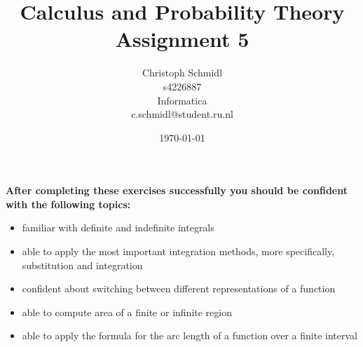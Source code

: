 \documentclass[a4paper]{article}
\title{Calculus and Probability Theory\\ Assignment 5}
\author{Christoph Schmidl\\
s4226887\\
Informatica\\
c.schmidl@student.ru.nl\\}
\date{\today}
\begin{document}
\maketitle





\textbf{After completing these exercises successfully you should be confident with the following topics:}

\begin{itemize}
	\item familiar with definite and indefinite integrals
	\item able to apply the most important integration methods, more specifically, substitution and integration
	\item confident about switching between different representations of a function
	\item able to compute area of a finite or infinite region
	\item able to apply the formula for the arc length of a function over a finite interval
\end{itemize}
\vspace{1em}
\end{document}
